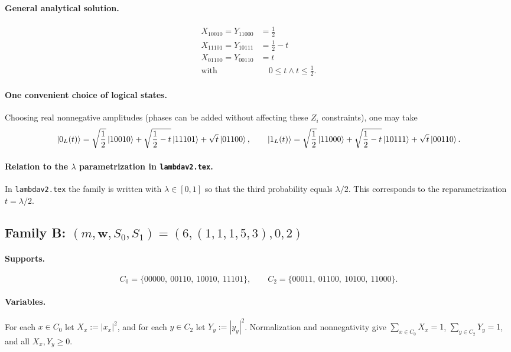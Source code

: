 \documentclass[11pt]{article}
\begin{document}
\paragraph{General analytical solution.}
\[
\begin{aligned}
X_{10010} = Y_{11000} &= \frac{1}{2}\\
X_{11101} = Y_{10111} &= \frac{1}{2} - t\\
X_{01100} = Y_{00110} &= t\\
\text{with }&\quad 0 \leq t \wedge t \leq \frac{1}{2}.
\end{aligned}
\]
\paragraph{One convenient choice of logical states.}
Choosing real nonnegative amplitudes (phases can be added without affecting these $Z_i$ constraints), one may take
\[
\ket{0_L(t)} = \sqrt{\frac{1}{2}}\ket{10010} + \sqrt{\frac{1}{2} - t}\ket{11101} + \sqrt{t}\ket{01100},\qquad \ket{1_L(t)} = \sqrt{\frac{1}{2}}\ket{11000} + \sqrt{\frac{1}{2} - t}\ket{10111} + \sqrt{t}\ket{00110}.
\]
\paragraph{Relation to the $\lambda$ parametrization in \texttt{lambdav2.tex}.}
In \texttt{lambdav2.tex} the family is written with $\lambda\in[0,1]$ so that the third probability equals $\lambda/2$. This corresponds to the reparametrization $t=\lambda/2$.


\subsection{Family B: $(m,\mathbf w,S_0,S_1)=(6,(1,1,1,5,3),0,2)$}

\paragraph{Supports.}
\[
C_0 = \{00000,\ 00110,\ 10010,\ 11101\},\qquad C_2 = \{00011,\ 01100,\ 10100,\ 11000\}.
\]

\paragraph{Variables.}
For each $x\in C_0$ let $X_x:=|x_x|^2$, and for each $y\in C_2$ let $Y_y:=|y_y|^2$.
Normalization and nonnegativity give $\sum_{x\in C_0}X_x=1$, $\sum_{y\in C_2}Y_y=1$, and all $X_x,Y_y\ge 0$.
\end{document}
